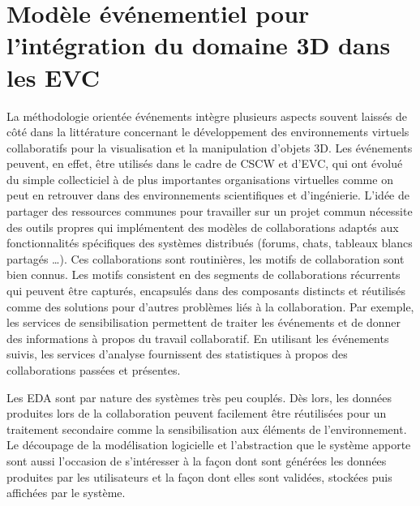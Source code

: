 
\section{Modèle événementiel pour l'intégration du domaine 3D dans les 
EVC}
\label{sec:modele_event}
La méthodologie orientée événements intègre plusieurs aspects souvent laissés 
de côté dans la littérature concernant le développement des environnements 
virtuels collaboratifs pour la visualisation et la manipulation d'objets \gls{3D}. 
Les événements peuvent, en effet, être utilisés dans le cadre de \gls{CSCW} et 
d'\gls{EVC}, qui ont évolué du simple collecticiel à de plus importantes 
organisations virtuelles comme on peut en retrouver dans des environnements 
scientifiques et d'ingénierie. L'idée de partager des ressources communes pour 
travailler sur un projet commun nécessite des outils propres qui implémentent 
des modèles de collaborations adaptés aux fonctionnalités spécifiques des 
systèmes distribués (forums, chats, tableaux blancs partagés \dots). Ces 
collaborations sont routinières, les motifs de collaboration sont bien connus. Les 
motifs consistent en des segments de collaborations récurrents qui peuvent être 
capturés, encapsulés dans des composants distincts et réutilisés comme des 
solutions pour d'autres problèmes liés à la collaboration. Par exemple, les services 
de sensibilisation permettent de traiter les événements et de donner des 
informations à propos du travail collaboratif. En utilisant les événements suivis, 
les services d'analyse fournissent des statistiques à propos des collaborations 
passées et présentes.


Les \gls{EDA} sont par nature des systèmes très peu couplés. Dès lors, les 
données produites lors de la collaboration peuvent facilement être réutilisées pour 
un traitement secondaire comme la sensibilisation aux éléments de 
l'environnement. 
Le découpage de la modélisation logicielle et l'abstraction que le système apporte 
sont aussi l'occasion de s'intéresser à la façon dont sont générées les données 
produites par les utilisateurs et la façon dont elles sont validées, stockées puis 
affichées par le système. 

